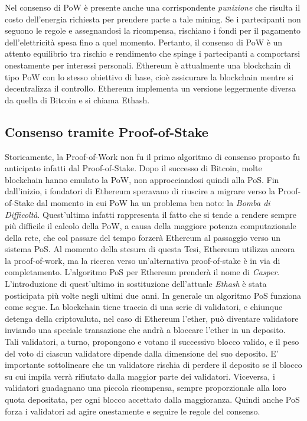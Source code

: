 Nel consenso di PoW è presente anche una corrispondente \textit{punizione} che risulta il costo dell'energia richiesta per prendere parte a tale mining. Se i partecipanti non seguono le regole e assegnandosi la ricompensa, rischiano i fondi per il pagamento dell'elettricità spesa fino a quel momento. Pertanto, il consenso di PoW è un attento equilibrio tra rischio e rendimento che spinge i partecipanti a comportarsi onestamente per interessi personali. Ethereum è attualmente una blockchain di tipo PoW con lo stesso obiettivo di base, cioè assicurare la blockchain mentre si decentralizza il controllo. Ethereum implementa un versione leggermente diversa da quella di Bitcoin e si chiama Ethash.

\subsection{Consenso tramite Proof-of-Stake}
Storicamente, la Proof-of-Work non fu il primo algoritmo di consenso proposto fu anticipato infatti dal Proof-of-Stake. Dopo il successo di Bitcoin, molte blockchain hanno emulato la PoW, non approcciandosi quindi alla PoS. Fin dall'inizio, i fondatori di Ethereum speravano di riuscire a migrare verso la Proof-of-Stake dal momento in cui PoW ha un problema ben noto: la \textit{Bomba di Difficoltà}. Quest'ultima infatti rappresenta il fatto che si tende a rendere sempre più difficile il calcolo della PoW, a causa della maggiore potenza computazionale della rete, che col passare del tempo forzerà Ethereum al passaggio verso un sistema PoS. Al momento della stesura di questa Tesi, Ethereum utilizza ancora la proof-of-work, ma la ricerca verso un'alternativa proof-of-stake è in via di completamento. L'algoritmo PoS per Ethereum prenderà il nome di \textit{Casper}. L'introduzione di quest'ultimo in sostituzione dell'attuale \textit{Ethash} è stata posticipata più volte negli ultimi due anni. In generale un algoritmo PoS funziona come segue. La blockchain tiene traccia di una serie di validatori, e chiunque detenga della criptovaluta, nel caso di Ethereum l'ether, può diventare validatore inviando una speciale transazione che andrà a bloccare l'ether in un deposito. Tali validatori, a turno, propongono e votano il successivo blocco valido, e il peso del voto di ciascun validatore dipende dalla dimensione del suo deposito. E' importante sottolineare che un validatore rischia di perdere il deposito se il blocco su cui impila verrà rifiutato dalla maggior parte dei validatori. Viceversa, i validatori guadagnano una piccola ricompensa, sempre proporzionale alla loro quota depositata, per ogni blocco accettato dalla maggioranza. Quindi anche PoS forza i validatori ad agire onestamente e seguire le regole del consenso.


